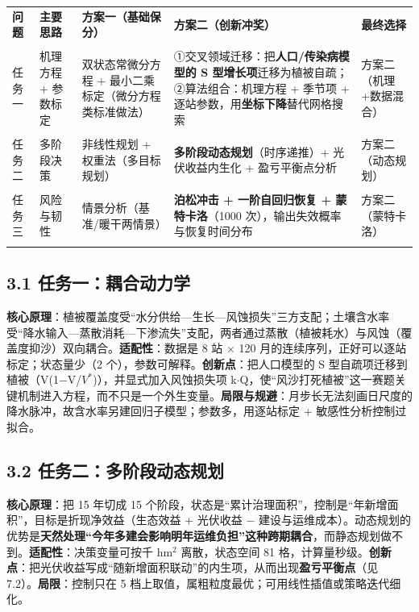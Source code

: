 \documentclass[11pt,a4paper]{ctexart}
\begin{document}
\begin{table}[H]\centering\small\setlength{\parskip}{2pt}
\begin{tabularx}{\textwidth}{|X|X|X|X|X|}
\toprule
\textbf{问题} & \textbf{主要思路} & \textbf{方案一（基础保分）} & \textbf{方案二（创新冲奖）} & \textbf{最终选择} \\\\
\midrule
任务一 & 机理方程 + 参数标定 & 双状态常微分方程 + 最小二乘标定（微分方程类标准做法） & ①交叉领域迁移：把\textbf{人口/传染病模型的 S 型增长项}迁移为植被自疏；②算法组合：机理方程 + 季节项 + 逐站参数，用\textbf{坐标下降}替代网格搜索 & 方案二（机理+数据混合） \\\\
任务二 & 多阶段决策 & 非线性规划 + 权重法（多目标规划） & \textbf{多阶段动态规划}（时序递推）+ 光伏收益内生化 + 盈亏平衡点分析 & 方案二（动态规划） \\\\
任务三 & 风险与韧性 & 情景分析（基准/暖干两情景） & \textbf{泊松冲击 + 一阶自回归恢复 + 蒙特卡洛}（1000 次），输出失效概率与恢复时间分布 & 方案二（蒙特卡洛） \\\\
\bottomrule
\end{tabularx}
\end{table}

\subsection*{3.1 任务一：耦合动力学}
\textbf{核心原理}：植被覆盖度受“水分供给—生长—风蚀损失”三方支配；土壤含水率受“降水输入—蒸散消耗—下渗流失”支配，两者通过蒸散（植被耗水）与风蚀（覆盖度抑沙）双向耦合。\textbf{适配性}：数据是 8 站 $\times$ 120 月的连续序列，正好可以逐站标定；状态量少（2 个），参数可解释。\textbf{创新点}：把人口模型的 S 型自疏项迁移到植被（V(1−V/$V^{*}$)），并显式加入风蚀损失项 k$\cdot$Q，使“风沙打死植被”这一赛题关键机制进入方程，而不只是一个外生变量。\textbf{局限与规避}：月步长无法刻画日尺度的降水脉冲，故含水率另建回归子模型；参数多，用逐站标定 + 敏感性分析控制过拟合。


\subsection*{3.2 任务二：多阶段动态规划}
\textbf{核心原理}：把 15 年切成 15 个阶段，状态是“累计治理面积”，控制是“年新增面积”，目标是折现净效益（生态效益 + 光伏收益 − 建设与运维成本）。动态规划的优势是\textbf{天然处理“今年多建会影响明年运维负担”这种跨期耦合}，而静态规划做不到。\textbf{适配性}：决策变量可按千 hm$^{2}$ 离散，状态空间 81 格，计算量秒级。\textbf{创新点}：把光伏收益写成“随新增面积联动”的内生项，从而出现\textbf{盈亏平衡点}（见 7.2）。\textbf{局限}：控制只在 5 档上取值，属粗粒度最优；可用线性插值或策略迭代细化。
\end{document}
